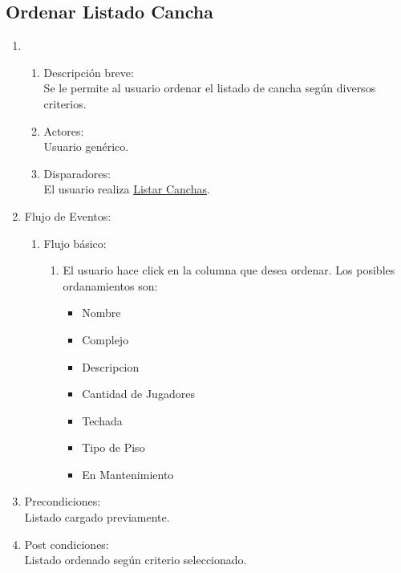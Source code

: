 \documentclass[a4paper,11pt]{article}
\begin{document}
\subsection{Ordenar Listado Cancha}
\begin{enumerate}

    \item
    \begin{enumerate}
    \item Descripci\'on breve: \\
        Se le permite al usuario ordenar el listado de cancha seg\'un diversos criterios.
    \item Actores: \\
        Usuario gen\'erico.
    \item Disparadores: \\
        El usuario realiza \underline{Listar Canchas}.
    \end{enumerate}

    \item Flujo de Eventos:

    \begin{enumerate}

        \item Flujo b\'asico:
        \begin{enumerate}
                    \item El usuario hace click en la columna que desea ordenar. Los posibles ordanamientos son:
			\begin{itemize}
			 \item Nombre
			 \item Complejo
			 \item Descripcion
			 \item Cantidad de Jugadores
			 \item Techada
			 \item Tipo de Piso
			 \item En Mantenimiento
			\end{itemize}
        \end{enumerate}
    \end{enumerate}

    \item Precondiciones: \\
        Listado cargado previamente.

    \item Post condiciones: \\
        Listado ordenado seg\'un criterio seleccionado.

\end{enumerate}
\end{document}
